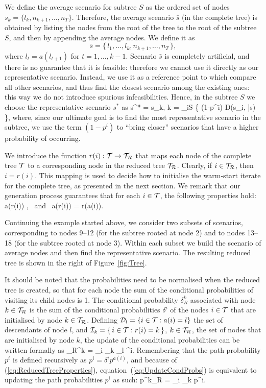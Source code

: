 We define the average scenario for subtree $S$ as the ordered
set of nodes $s_k = \{ l_k, n_{k+1}, \ldots, n_T \}$.
Therefore, the average scenario $\bar s$ (in the complete tree) 
is obtained by listing the 
nodes from the root of the tree to the root of the subtree $S$, and 
then by appending the average nodes. We define it as
\[
\bar s = \{\, l_1, \ldots, l_k, n_{k+1}, \ldots, n_T \,\},
\]
where $l_t = a(l_{t+1})$ for $t = 1,\ldots, k-1$.
Scenario $\bar{s}$ is completely artificial, and there is no guarantee 
that it is feasible: therefore we cannot use it directly as our 
representative scenario. Instead, we use it as a reference point to 
which compare all other scenarios, and thus find the closest scenario 
among the existing ones: this way we do not introduce spurious 
infeasibilities. Hence, in the subtree $S$ we choose the 
representative scenario $s^*$ as 
%
\be  \label{repScenario}
   s^* = s_k, \quad k = \arg\min_{i\in S} \{ (1-p^i) D(s_i, \bar{s}) \},
\ee
%
where, since our ultimate goal is to find the most representative scenario in 
the subtree, we use the term $(1-p^i)$ to ``bring closer'' scenarios 
that have a higher probability of occurring.

We introduce the function $r(i): \mathcal{T} \to \mathcal{T}_\mathcal{R}$ that maps each
node of the complete tree $\mathcal{T}$ to a corresponding node in
the reduced tree $\mathcal{T}_\mathcal{R}$. Clearly, if $i \in \mathcal{T}_\mathcal{R}$, then
$i = r(i)$.
This mapping is used to decide how to initialise 
the warm-start iterate for the complete tree, as presented in the
next section. We remark that our generation process guarantees
that for each $i \in \mathcal{T}$, the following properties hold:
\be  \label{eq:ReducedTreeProperties}
  a(r(i)) \in \Rtree, \quad \mbox{ and } \quad a(r(i)) = r(a(i)).
\ee

Continuing the example started above, we consider two subsets of 
scenarios, corresponding to nodes 9--12 (for the subtree rooted at 
node 2) and to nodes 13--18 (for the subtree rooted at node 3). Within 
each subset we build the scenario of average nodes and then find the 
representative scenario.
The resulting reduced tree is shown in the right of Figure~\ref{fig:Tree}.

It should be noted that the probabilities need to be normalised when 
the reduced tree is created, so that for each node the sum of the
conditional probabilities of visiting its child nodes is 1.
The conditional probability $\delta_R^k$ associated with node $k \in \mathcal{T}_\mathcal{R}$
is the sum of the conditional probabilities $\delta^i$ of the nodes 
$i \in \mathcal{T}$ that are initialised by node $k \in \mathcal{T}_\mathcal{R}$.
Defining $\mathcal{D}_{l} = \{ i \in \mathcal{T} : a(i) = l \}$
the set of descendants of node $l$, and
$\mathcal{I}_k = \{\, i \in \mathcal{T} : r(i) = k \,\}$, $k \in \mathcal{T}_\mathcal{R}$,
the set of nodes that are initialised by node $k$,
the update of the conditional probabilities can be written formally as
\be  \label{eq:UpdateCondProbs}
  \delta_R^k = \sum_{i \in {}_k \cap {}_{l}} \delta^i.
\ee
%
Remembering that the path probability $p^i$ is defined recursively as
$p^i = \delta^i p^{a(i)}$, and because of (\ref{eq:ReducedTreeProperties}),
equation~(\ref{eq:UpdateCondProbs}) is equivalent 
to updating the path probabilities $p^i$ as such:
\be  \label{eq:UpdatePathProbs}
  p^k_R = \sum_{i \in {}_k} p^i.
\ee


